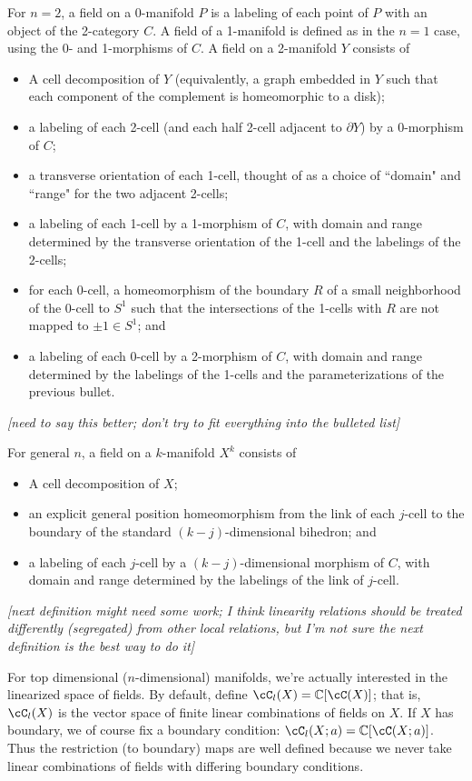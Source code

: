 \documentclass[11pt,leqno]{article}
\def\c{\mathbb{C}}
\def\bd{\partial}
\def\nn#1{{{\it \small [#1]}}}
\begin{document}
For $n=2$, a field on a 0-manifold $P$ is a labeling of each point of $P$ with
an object of the 2-category $C$.
A field of a 1-manifold is defined as in the $n=1$ case, using the 0- and 1-morphisms of $C$.
A field on a 2-manifold $Y$ consists of
\begin{itemize}
	\item A cell decomposition of $Y$ (equivalently, a graph embedded in $Y$ such
that each component of the complement is homeomorphic to a disk);
	\item a labeling of each 2-cell (and each half 2-cell adjacent to $\bd Y$)
by a 0-morphism of $C$;
	\item a transverse orientation of each 1-cell, thought of as a choice of
``domain" and ``range" for the two adjacent 2-cells;
	\item a labeling of each 1-cell by a 1-morphism of $C$, with
domain and range determined by the transverse orientation of the 1-cell 
and the labelings of the 2-cells;
	\item for each 0-cell, a homeomorphism of the boundary $R$ of a small neighborhood 
of the 0-cell to $S^1$ such that the intersections of the 1-cells with $R$ are not mapped
to $\pm 1 \in S^1$; and
	\item a labeling of each 0-cell by a 2-morphism of $C$, with domain and range 
determined by the labelings of the 1-cells and the parameterizations of the previous
bullet.
\end{itemize}
\nn{need to say this better; don't try to fit everything into the bulleted list}

For general $n$, a field on a $k$-manifold $X^k$ consists of
\begin{itemize}
	\item A cell decomposition of $X$;
	\item an explicit general position homeomorphism from the link of each $j$-cell
to the boundary of the standard $(k-j)$-dimensional bihedron; and
	\item a labeling of each $j$-cell by a $(k-j)$-dimensional morphism of $C$, with
domain and range determined by the labelings of the link of $j$-cell.
\end{itemize}

\nn{next definition might need some work; I think linearity relations should
be treated differently (segregated) from other local relations, but I'm not sure
the next definition is the best way to do it}

For top dimensional ($n$-dimensional) manifolds, we're actually interested 
in the linearized space of fields.
By default, define $\cC_l(X) = \c[\cC(X)]$; that is, $\cC_l(X)$ is
the vector space of finite 
linear combinations of fields on $X$.
If $X$ has boundary, we of course fix a boundary condition: $\cC_l(X; a) = \c[\cC(X; a)]$.
Thus the restriction (to boundary) maps are well defined because we never
take linear combinations of fields with differing boundary conditions.
\end{document}
